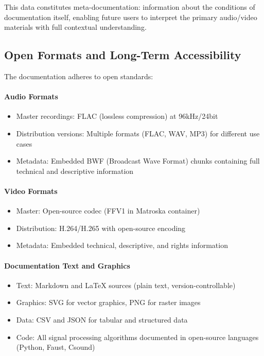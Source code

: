 This data constitutes meta-documentation: information about the conditions of 
documentation itself, enabling future users to interpret the primary audio/video 
materials with full contextual understanding.

\subsection{Open Formats and Long-Term Accessibility}

The documentation adheres to open standards:

\paragraph{Audio Formats}
\begin{itemize}
  \item Master recordings: FLAC (lossless compression) at 96kHz/24bit
  \item Distribution versions: Multiple formats (FLAC, WAV, MP3) for different 
  use cases
  \item Metadata: Embedded BWF (Broadcast Wave Format) chunks containing full 
  technical and descriptive information
\end{itemize}

\paragraph{Video Formats}
\begin{itemize}
  \item Master: Open-source codec (FFV1 in Matroska container)
  \item Distribution: H.264/H.265 with open-source encoding
  \item Metadata: Embedded technical, descriptive, and rights information
\end{itemize}

\paragraph{Documentation Text and Graphics}
\begin{itemize}
  \item Text: Markdown and LaTeX sources (plain text, version-controllable)
  \item Graphics: SVG for vector graphics, PNG for raster images
  \item Data: CSV and JSON for tabular and structured data
  \item Code: All signal processing algorithms documented in open-source 
  languages (Python, Faust, Csound)
\end{itemize}

